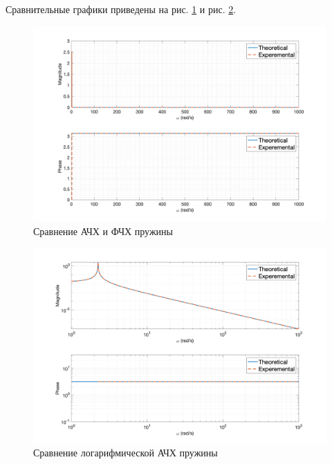 Сравнительные графики приведены на рис. \ref{fig:task4_freq_resp_cmp_lin} и рис. \ref{fig:task4_freq_resp_cmp_loglog}.
\begin{figure}[ht!]
    \centering
    \includegraphics[width=\textwidth]{media/plots/task4_freq_resp_cmp_lin.png}
    \caption{Сравнение АЧХ и ФЧХ пружины}
    \label{fig:task4_freq_resp_cmp_lin}
\end{figure}
\begin{figure}[ht!]
    \centering
    \includegraphics[width=\textwidth]{media/plots/task4_freq_resp_cmp_loglog.png}
    \caption{Сравнение логарифмической АЧХ пружины}
    \label{fig:task4_freq_resp_cmp_loglog}
\end{figure}